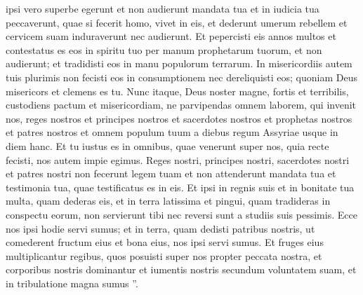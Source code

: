 \begin{biblechapter}
\begin{biblechapter}
\begin{biblechapter}
\begin{biblechapter}
\begin{biblechapter}
\begin{biblechapter}
\begin{biblechapter}
\begin{biblechapter}
\begin{biblechapter}
 ipsi vero superbe egerunt et non audierunt mandata tua
 et in iudicia tua peccaverunt, quae si fecerit homo, vivet in eis, et dederunt umerum rebellem
 et cervicem suam induraverunt nec audierunt.
 \verse Et pepercisti eis annos multos
 et contestatus es eos in spiritu tuo
 per manum prophetarum tuorum, et non audierunt;
 et tradidisti eos in manu populorum terrarum.
 \verse In misericordiis autem tuis plurimis
 non fecisti eos in consumptionem
 nec dereliquisti eos;
 quoniam Deus misericors et clemens es tu.
 \verse Nunc itaque, Deus noster magne, fortis et terribilis,
 custodiens pactum et misericordiam,
 ne parvipendas omnem laborem,
 qui invenit nos, reges nostros et principes nostros
 et sacerdotes nostros et prophetas nostros
 et patres nostros et omnem populum tuum
 a diebus regum Assyriae usque in diem hanc.
 \verse Et tu iustus es in omnibus, quae venerunt super nos,
 quia recte fecisti,
 nos autem impie egimus.
 \verse Reges nostri, principes nostri, sacerdotes nostri et patres nostri
 non fecerunt legem tuam
 et non attenderunt mandata tua et testimonia tua,
 quae testificatus es in eis.
 \verse Et ipsi in regnis suis et in bonitate tua multa, quam dederas eis,
 et in terra latissima et pingui,
 quam tradideras in conspectu eorum,
 non servierunt tibi nec reversi sunt a studiis suis pessimis.
 \verse Ecce nos ipsi hodie servi sumus;
 et in terra, quam dedisti patribus nostris,
 ut comederent fructum eius et bona eius, nos ipsi servi sumus.
 \verse Et fruges eius multiplicantur regibus,
 quos posuisti super nos propter peccata nostra,
 et corporibus nostris dominantur et iumentis nostris
 secundum voluntatem suam,
 et in tribulatione magna sumus ”.
 

\end{biblechapter}
\end{biblechapter}
\end{biblechapter}
\end{biblechapter}
\end{biblechapter}
\end{biblechapter}
\end{biblechapter}
\end{biblechapter}
\end{biblechapter}

